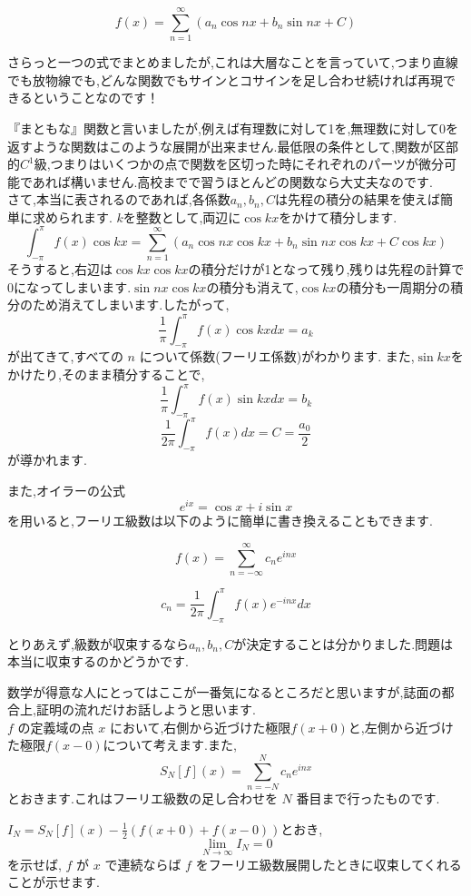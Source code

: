 \[
  f(x) = \sum_{n=1}^\infty (a_n \cos nx + b_n \sin nx + C)
\]

さらっと一つの式でまとめましたが,これは大層なことを言っていて,つまり直線でも放物線でも,どんな関数でもサインとコサインを足し合わせ続ければ再現できるということなのです！

『まともな』関数と言いましたが,例えば有理数に対して1を,無理数に対して0を返すような関数はこのような展開が出来ません.最低限の条件として,関数が区部的$C^1$級,つまりはいくつかの点で関数を区切った時にそれぞれのパーツが微分可能であれば構いません.高校までで習うほとんどの関数なら大丈夫なのです.\\

さて,本当に表されるのであれば,各係数$a_n,b_n,C$は先程の積分の結果を使えば簡単に求められます.
$k$を整数として,両辺に$\cos kx$をかけて積分します.
\[
  \int_{-\pi}^\pi f(x) \cos kx = \sum_{n=1}^\infty (a_n \cos nx \cos kx+ b_n \sin nx \cos kx + C \cos kx)
\]
そうすると,右辺は$\cos kx \cos kx$の積分だけが1となって残り,残りは先程の計算で0になってしまいます.$\sin nx \cos kx$の積分も消えて,$\cos kx$の積分も一周期分の積分のため消えてしまいます.したがって,
\[
  \frac{1}{\pi} \int_{-\pi}^\pi f(x) \cos kx dx = a_k
\]
が出てきて,すべての $n$ について係数(フーリエ係数)がわかります.
また,$\sin kx$をかけたり,そのまま積分することで,
\[
  \frac{1}{\pi} \int_{-\pi}^\pi f(x) \sin kx dx = b_k
\]
\[
  \frac{1}{2 \pi} \int_{-\pi}^\pi f(x) dx = C = \frac{a_0}{2}
\]
が導かれます.

また,オイラーの公式
\[e^{ix} = \cos x + i \sin x\]
を用いると,フーリエ級数は以下のように簡単に書き換えることもできます.

\[
  f(x) = \sum_{n=-\infty}^\infty c_n e^{inx}
\]

\[
  c_n = \frac{1}{2\pi} \int_{-\pi}^\pi f(x) e^{-inx} dx
\]

とりあえず,級数が収束するなら$a_n,b_n,C$が決定することは分かりました.問題は本当に収束するのかどうかです.

数学が得意な人にとってはここが一番気になるところだと思いますが,誌面の都合上,証明の流れだけお話しようと思います.\\

$f$ の定義域の点 $x$ において,右側から近づけた極限$f(x+0)$と,左側から近づけた極限$f(x-0)$について考えます.また,
\[
  S_N[f](x) = \sum_{n=-N}^N c_n e^{inx}
\]
とおきます.これはフーリエ級数の足し合わせを $N$ 番目まで行ったものです.

$I_N = S_N[f](x) - \frac{1}{2}(f(x+0)+f(x-0))$とおき,
\[
  \lim_{N \to \infty} I_N = 0
\]
を示せば, $f$ が $x$ で連続ならば $f$ をフーリエ級数展開したときに収束してくれることが示せます.

